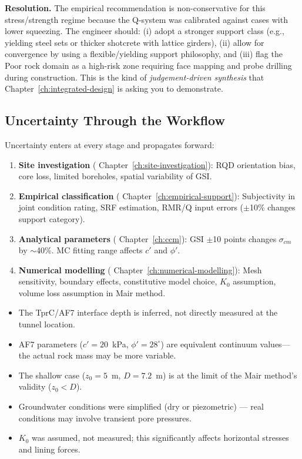 \noindent \textbf{Resolution.} The empirical recommendation is non-conservative for this stress/strength regime because the Q-system was calibrated against cases with lower squeezing. The engineer should: (i) adopt a stronger support class (e.g., yielding steel sets or thicker shotcrete with lattice girders), (ii) allow for convergence by using a flexible/yielding support philosophy, and (iii) flag the Poor rock domain as a high-risk zone requiring face mapping and probe drilling during construction. This is the kind of \textit{judgement-driven synthesis} that Chapter~\ref{ch:integrated-design} is asking you to demonstrate.

\subsection{Uncertainty Through the Workflow}

Uncertainty enters at every stage and propagates forward:

\begin{enumerate}
 \item \textbf{Site investigation} ( Chapter~\ref{ch:site-investigation}): RQD orientation bias, core loss, limited boreholes, spatial variability of GSI.
 \item \textbf{Empirical classification} ( Chapter~\ref{ch:empirical-support}): Subjectivity in joint condition rating, SRF estimation, RMR/Q input errors ($\pm$10\% changes support category).
 \item \textbf{Analytical parameters} ( Chapter~\ref{ch:ccm}): GSI $\pm$10 points changes $\sigma_{cm}$ by $\sim$40\%. MC fitting range affects $c'$ and $\phi'$.
 \item \textbf{Numerical modelling} ( Chapter~\ref{ch:numerical-modelling}): Mesh sensitivity, boundary effects, constitutive model choice, $K_0$ assumption, volume loss assumption in Mair method.
\end{enumerate}

\begin{cautionbox}
\begin{itemize}[nosep]
 \item The TprC/AF7 interface depth is inferred, not directly measured at the tunnel location.
 \item AF7 parameters ($c'=20$~kPa, $\phi'=28^\circ$) are equivalent continuum values---the actual rock mass may be more variable.
 \item The shallow case ($z_0=5$~m, $D=7.2$~m) is at the limit of the Mair method's validity ($z_0 < D$).
 \item Groundwater conditions were simplified (dry or piezometric) --- real conditions may involve transient pore pressures.
 \item $K_0$ was assumed, not measured; this significantly affects horizontal stresses and lining forces.
\end{itemize}
\end{cautionbox}

